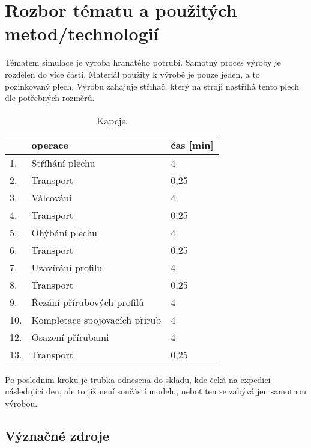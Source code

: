 \documentclass[11pt, a4paper]{article}
\begin{document}
\section{Rozbor tématu a použitých metod/technologií}
Tématem simulace je výroba hranatého potrubí. Samotný proces výroby je rozdělen do více částí. Materiál použitý k výrobě je pouze jeden, a to pozinkovaný plech. Výrobu zahajuje střihač, který na stroji nastříhá tento plech dle potřebných rozměrů.
\begin{table}[H]
    \centering
    \begin{tabular}{|l|l|l|}
     \hline  & \textbf{operace} &  \textbf{čas [min]}\\ \hline
    1. &                Stříhání plechu   &  4\\ 
    2. &\hspace{0.1cm}  Transport   &  0,25\\ \hline
    3. &                Válcování    &  4\\ 
    4. &\hspace{0.1cm}  Transport   &  0,25\\ \hline
    5. &                Ohýbání plechu    &  4\\ 
    6. &\hspace{0.1cm}  Transport   &  0,25\\ \hline
    7. &                Uzavírání profilu    &  4\\ 
    8. &\hspace{0.1cm}  Transport   &  0,25\\ \hline
    9. &                Řezání přírubových profilů    &  4\\ \hline
    10. &               Kompletace spojovacích přírub    &  4\\ \hline
    12. &                Osazení přírubami    &  4\\ 
    13. &\hspace{0.1cm}  Transport   &  0,25\\ \hline
    
    \end{tabular}
    \caption{Kapcja}
    \label{rgrg}
\end{table}

Po posledním kroku je trubka odnesena do skladu, kde čeká na expedici následující den, ale to již není součástí modelu, neboť ten se zabývá jen samotnou výrobou.

\subsection{Význačné zdroje}
\end{document}
